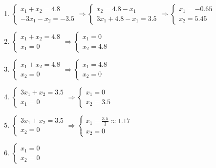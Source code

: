 \begin{enumerate}
\setlength{\abovedisplayskip}{-10pt}
\item 
	$\begin{cases}
		x_1 + x_2 = 4.8 \\
		-3x_1 - x_2 = -3.5
	\end{cases}
	\Rightarrow
	\begin{cases}
		x_2 = 4.8 - x_1 \\
		3x_1 + 4.8 - x_1 = 3.5
	\end{cases}
	\Rightarrow
	\begin{cases}
		x_1 = -0.65 \\
		x_2 = 5.45
	\end{cases}$
	
\item
	\label{eq:bad_basis_1}
	$\begin{cases}
		x_1 + x_2 = 4.8 \\
		x_1 = 0
	\end{cases}
	\Rightarrow
	\begin{cases}
		x_1 = 0 \\
		x_2 = 4.8
	\end{cases}$
	
\item
	$\begin{cases}
		x_1 + x_2 = 4.8 \\
		x_2 = 0
	\end{cases}
	\Rightarrow
	\begin{cases}
		x_1 = 4.8 \\
		x_2 = 0
	\end{cases}$
	
\item
	$\begin{cases}
		3x_1 + x_2 = 3.5 \\
		x_1 = 0
	\end{cases}
	\Rightarrow
	\begin{cases}
		x_1 = 0 \\
		x_2 = 3.5
	\end{cases}$
	
\item
	$\begin{cases}
		3x_1 + x_2 = 3.5 \\
		x_2 = 0
	\end{cases}
	\Rightarrow
	\begin{cases}
		x_1 = \frac{3.5}{3} \approx 1.17 \\
		x_2 = 0
	\end{cases}$
	
\item 
	\label{eq:bad_basis_2}
	$\begin{cases}
		x_1 = 0 \\
		x_2 = 0
	\end{cases}$
\end{enumerate}


